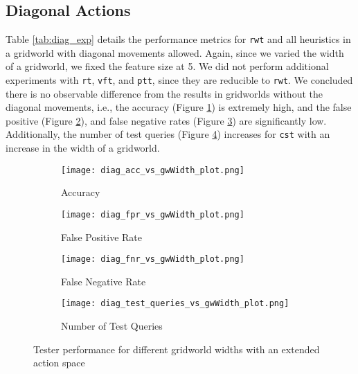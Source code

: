 \subsection{Diagonal Actions}
Table \ref{tab:diag_exp} details the performance metrics for \texttt{rwt} and all heuristics in a gridworld with diagonal movements allowed. Again, since we varied the width of a gridworld, we fixed the feature size at 5. We did not perform additional experiments with \texttt{rt}, \texttt{vft}, and \texttt{ptt}, since they are reducible to \texttt{rwt}. We concluded there is no observable difference from the results in gridworlds without the diagonal movements, i.e., the accuracy (Figure \ref{fig:diag_acc_vs_gwWidth_plot}) is extremely high, and the false positive (Figure \ref{fig:diag_fpr_vs_gwWidth_plot}), and false negative rates (Figure \ref{fig:diag_fnr_vs_gwWidth_plot}) are significantly low. Additionally, the number of test queries (Figure \ref{fig:diag_test_queries_vs_gwWidth_plot}) increases for \texttt{cst} with an increase in the width of a gridworld.

\begin{figure}[h]
     \centering
     \begin{subfigure}[h]{0.4\textwidth}
         \centering
         \texttt{[image: diag\_acc\_vs\_gwWidth\_plot.png]}
         \caption{Accuracy}
         \label{fig:diag_acc_vs_gwWidth_plot}
     \end{subfigure}
    \hspace{5mm}
     \begin{subfigure}[h]{0.4\textwidth}
         \centering
         \texttt{[image: diag\_fpr\_vs\_gwWidth\_plot.png]}
         \caption{False Positive Rate}
         \label{fig:diag_fpr_vs_gwWidth_plot}
     \end{subfigure}
     \hspace{5mm}
     \begin{subfigure}[h]{0.4\textwidth}
         \centering
         \texttt{[image: diag\_fnr\_vs\_gwWidth\_plot.png]}
         \caption{False Negative Rate}
         \label{fig:diag_fnr_vs_gwWidth_plot}
     \end{subfigure}
     \hspace{5mm}
    \begin{subfigure}[h]{0.4\textwidth}
         \centering
         \texttt{[image: diag\_test\_queries\_vs\_gwWidth\_plot.png]}
         \caption{Number of Test Queries}
         \label{fig:diag_test_queries_vs_gwWidth_plot}
     \end{subfigure}
    \caption{Tester performance for different gridworld widths with an extended action space}
    \label{fig:diag_experiments}
\end{figure}



